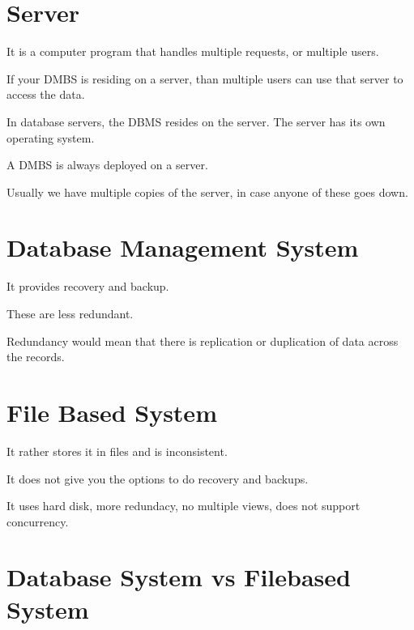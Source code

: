 \documentclass{article}
\begin{document}
    \tableofcontents

    \section{Server}

    It is a computer program that handles multiple requests, or multiple users.

    If your DMBS is residing on a server, than multiple users can use that server to access the data.

    In database servers, the DBMS resides on the server. The server has its own operating system.   

    A DMBS is always deployed on a server.

    Usually we have multiple copies of the server, in case anyone of these goes down. 

    \section{Database Management System}

    It provides recovery and backup.

    These are less redundant.

    Redundancy would mean that there is replication or duplication of data across the records.

    \section{File Based System}

    It rather stores it in files and is inconsistent.

    It does not give you the options to do recovery and backups.

    It uses hard disk, more redundacy, no multiple views, does not support concurrency.

    \section{Database System vs Filebased System}
\end{document}
